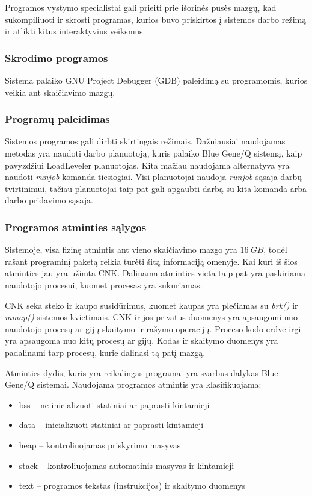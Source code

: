 Programos vystymo specialistai gali prieiti prie išorinės pusės mazgų, kad sukompiliuoti ir skrosti programas, kurios buvo priskirtos į sistemos darbo režimą ir atlikti kitus interaktyvius veiksmus.

\subsubsection{Skrodimo programos}

Sistema palaiko GNU Project Debugger (GDB) paleidimą su programomis, kurios veikia ant skaičiavimo mazgų.

\subsubsection{Programų paleidimas}

Sistemos programos gali dirbti skirtingais režimais.
Dažniausiai naudojamas metodas yra naudoti darbo planuotoją, kuris palaiko Blue Gene/Q sistemą, kaip pavyzdžiui LoadLeveler planuotojas.
Kita mažiau naudojama alternatyva yra naudoti \textit{runjob} komanda tiesiogiai.
Visi planuotojai naudoja \textit{runjob} sąsaja darbų tvirtinimui, tačiau planuotojai taip pat gali apgaubti darbą su kita komanda arba darbo pridavimo sąsaja.

\subsubsection{Programos atminties sąlygos}

Sistemoje, visa fizinę atmintis ant vieno skaičiavimo mazgo yra $16~GB$, todėl rašant programinį paketą reikia turėti šitą informaciją omenyje.
Kai kuri iš šios atminties jau yra užimta CNK.
Dalinama atminties vieta taip pat yra paskiriama naudotojo procesui, kuomet procesas yra sukuriamas.

CNK seka steko ir kaupo susidūrimus, kuomet kaupas yra plečiamas su \textit{brk()} ir \textit{mmap()} sistemos kvietimais.
CNK ir jos privatūs duomenys yra apsaugomi nuo naudotojo procesų ar gijų skaitymo ir rašymo operacijų.
Proceso kodo erdvė irgi yra apsaugoma nuo kitų procesų ar gijų.
Kodas ir skaitymo duomenys yra padalinami tarp procesų, kurie dalinasi tą patį mazgą.

Atminties dydis, kuris yra reikalingas programai yra svarbus dalykas Blue Gene/Q sistemai.
Naudojama programos atmintis yra klasifikuojama:

\begin{itemize}
    \item bss -- ne inicializuoti statiniai ar paprasti kintamieji
    \item data -- inicializuoti statiniai ar paprasti kintamieji
    \item heap -- kontroliuojamas priskyrimo masyvas
    \item stack -- kontroliuojamas automatinis masyvas ir kintamieji
    \item text -- programos tekstas (instrukcijos) ir skaitymo duomenys
\end{itemize}


